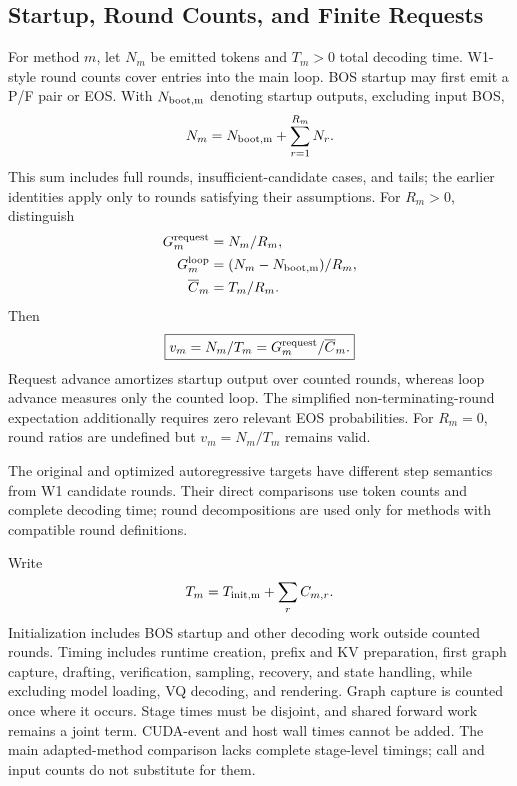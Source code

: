 \subsection{Startup, Round Counts, and Finite Requests}
\label{app:timing}
For method $m$, let $N_m$ be emitted tokens and $T_m>0$ total decoding time. W1-style round counts cover entries into the main loop. BOS startup may first emit a P/F pair or EOS. With $N_{\rm boot,m}$ denoting startup outputs, excluding input BOS,
\begin{equation}
N_m=N_{\rm boot,m}+\sum_{r=1}^{R_m}N_r.
\end{equation}
This sum includes full rounds, insufficient-candidate cases, and tails; the earlier identities apply only to rounds satisfying their assumptions. For $R_m>0$, distinguish
\begin{align}
G_m^{\rm request}&=N_m/R_m,\\
G_m^{\rm loop}&=(N_m-N_{\rm boot,m})/R_m,\\
\overline C_m&=T_m/R_m.
\end{align}
Then
\begin{equation}
\boxed{v_m=N_m/T_m=G_m^{\rm request}/\overline C_m.}
\end{equation}
Request advance amortizes startup output over counted rounds, whereas loop advance measures only the counted loop. The simplified non-terminating-round expectation additionally requires zero relevant EOS probabilities. For $R_m=0$, round ratios are undefined but $v_m=N_m/T_m$ remains valid.

The original and optimized autoregressive targets have different step semantics from W1 candidate rounds. Their direct comparisons use token counts and complete decoding time; round decompositions are used only for methods with compatible round definitions.

Write
\begin{equation}
T_m=T_{\rm init,m}+\sum_rC_{m,r}.
\end{equation}
Initialization includes BOS startup and other decoding work outside counted rounds. Timing includes runtime creation, prefix and KV preparation, first graph capture, drafting, verification, sampling, recovery, and state handling, while excluding model loading, VQ decoding, and rendering. Graph capture is counted once where it occurs. Stage times must be disjoint, and shared forward work remains a joint term. CUDA-event and host wall times cannot be added. The main adapted-method comparison lacks complete stage-level timings; call and input counts do not substitute for them.


